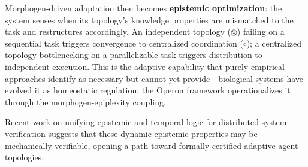Morphogen-driven adaptation then becomes \textbf{epistemic optimization}: the system senses when its topology's knowledge properties are mismatched to the task and restructures accordingly. An independent topology ($\otimes$) failing on a sequential task triggers convergence to centralized coordination ($\circ$); a centralized topology bottlenecking on a parallelizable task triggers distribution to independent execution. This is the adaptive capability that purely empirical approaches \cite{kim2025scaling} identify as necessary but cannot yet provide---biological systems have evolved it as homeostatic regulation; the Operon framework operationalizes it through the morphogen-epiplexity coupling.

Recent work on unifying epistemic and temporal logic for distributed system verification suggests that these dynamic epistemic properties may be mechanically verifiable, opening a path toward formally certified adaptive agent topologies.
